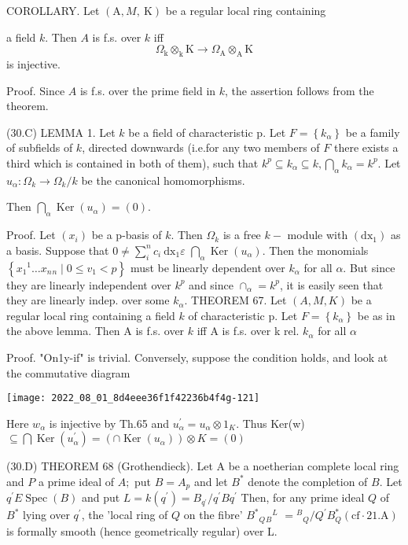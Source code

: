 COROLLARY. Let $(\mathrm{A}, M, \mathrm{~K})$ be a regular local ring containing

a field $k$. Then $A$ is f.s. over $k$ iff
$$
\Omega_{\mathrm{k}} \otimes_{\mathrm{k}} \mathrm{K} \rightarrow \Omega_{\mathrm{A}} \otimes_{\mathrm{A}} \mathrm{K}
$$
is injective.

Proof. Since $A$ is f.s. over the prime field in $k$, the assertion follows from the theorem.

(30.C) LEMMA 1. Let $k$ be a field of characteristic p. Let $F=\left\{k_{\alpha}\right\}$ be a family of subfields of $k$, directed downwards (i.e.for any two members of $F$ there exists a third which is contained in both of them), such that $k^{p} \subseteq k_{\alpha} \subseteq k, \bigcap_{\alpha} k_{\alpha}=k^{p}$. Let $u_{\alpha}: \Omega_{k} \rightarrow \Omega_{k} / k$ be the canonical homomorphisms.

Then $\bigcap_{\alpha} \operatorname{Ker}\left(u_{\alpha}\right)=(0)$.

Proof. Let $\left(x_{i}\right)$ be a p-basis of $k$. Then $\Omega_{k}$ is a free $k-$ module with $\left(\mathrm{d} \mathrm{x}_{1}\right)$ as a basis. Suppose that $0 \neq \sum_{i}^{n} c_{i} \mathrm{~d} \mathrm{x}_{1} \varepsilon$ $\bigcap_{\alpha} \operatorname{Ker}\left(u_{\alpha}\right)$. Then the monomials $\left\{x_{1}{ }^{1} \ldots x_{n}{ }_{n} \mid 0 \leqslant v_{1}<p\right\}$ must be linearly dependent over $k_{\alpha}$ for all $\alpha$. But since they are linearly independent over $k^{p}$ and since $\cap_{\alpha}=k^{p}$, it is easily seen that they are linearly indep. over some $k_{\alpha}$. THEOREM 67. Let $(A, M, K)$ be a regular local ring containing a field $k$ of characteristic p. Let $F=\left\{k_{\alpha}\right\}$ be as in the above lemma. Then A is f.s. over $k$ iff A is f.s. over k rel. $k_{\alpha}$ for all $\alpha$

Proof. "On1y-if" is trivial. Conversely, suppose the condition holds, and look at the commutative diagram

\texttt{[image: 2022\_08\_01\_8d4eee36f1f42236b4f4g-121]}

Here $w_{\alpha}$ is injective by Th.65 and $u_{\alpha}^{\prime}=u_{\alpha} \otimes 1_{K}$. Thus Ker(w) $\subseteq \bigcap \operatorname{Ker}\left(u_{\alpha}^{\prime}\right)=\left(\cap \operatorname{Ker}\left(u_{\alpha}\right)\right) \otimes K=(0)$

(30.D) THEOREM 68 (Grothendieck). Let A be a noetherian complete local ring and $P$ a prime ideal of $A ;$ put $B=A_{p}$ and let $B^{*}$ denote the completion of $B$. Let $q^{\prime} E \operatorname{Spec}(B)$ and put $L=k\left(q^{\prime}\right)=B_{q^{\prime}} / q^{\prime} B q^{\prime}$ Then, for any prime ideal $Q$ of $B^{*}$ lying over $q^{\prime}$, the 'local ring of $Q$ on the fibre' $B^{*}{ }_{Q}{ }_{B}{ }^{L}$ $={ }^{B}{ }_{Q} / Q^{\prime} B_{Q}^{*}(\mathrm{cf} \cdot 21 . \mathrm{A})$ is formally smooth (hence geometrically regular) over L.

